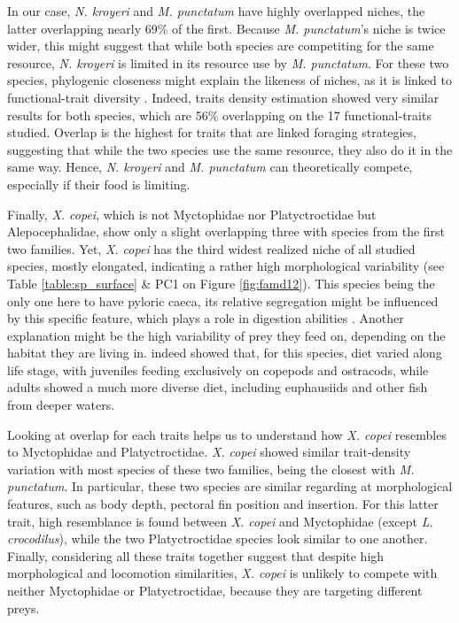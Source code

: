 In our case, \textit{N. kroyeri} and \textit{M. punctatum} have highly overlapped niches, the latter overlapping nearly 69\% of the first. Because \textit{M. punctatum}'s niche is twice wider, this might suggest that while both species are competiting for the same resource, \textit{N. kroyeri} is limited in its resource use by \textit{M. punctatum}. For these two species, phylogenic closeness might explain the likeness of niches, as it is linked to functional-trait diversity \citep{tucker2018}. Indeed, traits density estimation showed very similar results for both species, which are 56\% overlapping on the 17 functional-traits studied. Overlap is the highest for traits that are linked foraging strategies, suggesting that while the two species use the same resource, they also do it in the same way. Hence, \textit{N. kroyeri} and \textit{M. punctatum} can theoretically compete, especially if their food is limiting.

Finally, \textit{X. copei}, which is not Myctophidae nor Platyctroctidae but Alepocephalidae, show only a slight overlapping three with species from the first two families. Yet, \textit{X. copei} has the third widest realized niche of all studied species, mostly elongated, indicating a rather high morphological variability (see Table \ref{table:sp_surface} \& PC1 on Figure \ref{fig:famd12}). This species being the only one here to have pyloric caeca, its relative segregation might be influenced by this specific feature, which plays a role in digestion abilities \citep{buddington1986}. Another explanation might be the high variability of prey they feed on, depending on the habitat they are living in. \citet{mauchline1983} indeed showed that, for this species, diet varied along life stage, with juveniles feeding exclusively on copepods and ostracods, while adults showed a much more diverse diet, including euphausiids and other fish from deeper waters. 

Looking at overlap for each traits helps us to understand how \textit{X. copei} resembles to Myctophidae and Platyctroctidae. \textit{X. copei} showed similar trait-density variation with most species of these two families, being the closest with \textit{M. punctatum}. In particular, these two species are similar regarding at morphological features, such as body depth, pectoral fin position and insertion. For this latter trait, high resemblance is found between \textit{X. copei} and Myctophidae (except \textit{L. crocodilus}), while the two Platyctroctidae species look similar to one another. Finally, considering all these traits together suggest that despite high morphological and locomotion similarities, \textit{X. copei} is unlikely to compete with neither Myctophidae or Platyctroctidae, because they are targeting different preys. 

